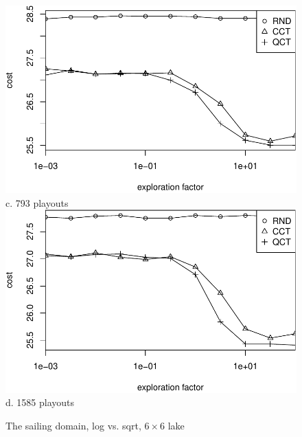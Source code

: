 \documentclass{article}
\begin{document}
\begin{figure}[t]
\begin{minipage}[b]{0.5\linewidth}
    \includegraphics[scale=0.45]{rcq-size=6-nsamples=793.pdf}\\
    c. 793 playouts\\
    \vspace{1em}
    \includegraphics[scale=0.45]{rcq-size=6-nsamples=1585.pdf}\\
    d. 1585 playouts\\
  \end{minipage}
  \caption{The sailing domain, log vs. sqrt, $6\times 6$ lake}
  \label{fig:sailing-cost-vs-factor}
\end{figure}
%
\end{document}
